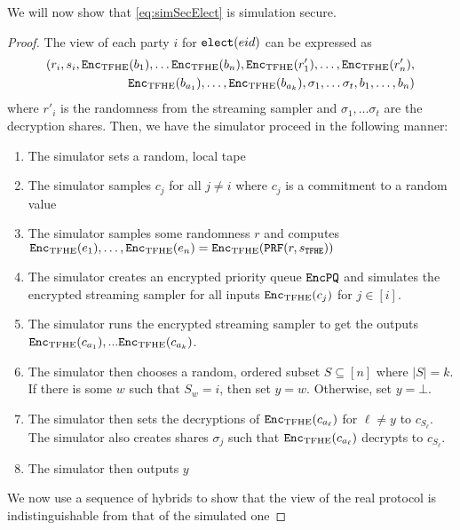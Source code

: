 \begin{lemma}
	We will now show that \cref{eq:simSecElect} is simulation secure.
	\begin{proof}
		The view of each party $i$ for $\texttt{elect}({eid})$ can be expressed as
		\begin{align*}
			(r_i,  s_i, \texttt{Enc}_{\mathrm{TFHE}}(b_{1}), \dots \texttt{Enc}_{\mathrm{TFHE}}(b_n), \texttt{Enc}_{\mathrm{TFHE}}(r'_1), \dots, \texttt{Enc}_{\mathrm{TFHE}}(r'_n), \\
				\texttt{Enc}_{\mathrm{TFHE}}(b_{a_1}), \dots, \texttt{Enc}_{\mathrm{TFHE}}(b_{a_k}), \sigma_1, \dots \sigma_t, b_1, \dots, b_n)
		\end{align*}
		where $r'_i$ is the randomness from the streaming sampler and $\sigma_1, \dots \sigma_t$ are the decryption shares.
		Then, we have the simulator proceed in the following manner:
		\begin{enumerate}
			\item The simulator sets a random, local tape
			\item The simulator samples $c_j$ for all $j \neq i$ where $c_j$ is a commitment to a random value
			\item The simulator samples some randomness $r$ and computes $\texttt{Enc}_{\mathrm{TFHE}}(e_1), \dots, \texttt{Enc}_{\mathrm{TFHE}}(e_n) = \texttt{Enc}_{\mathrm{TFHE}}(\texttt{PRF}(r, s_\texttt{TFHE}))$
			\item The simulator creates an encrypted priority queue $\texttt{EncPQ}$ and simulates the encrypted streaming sampler for all inputs $\texttt{Enc}_{\mathrm{TFHE}}(c_j)$ for $j \in [i]$.
			\item The simulator runs the encrypted streaming sampler to get the outputs $\texttt{Enc}_{\mathrm{TFHE}}(c_{a_1}),... \texttt{Enc}_{\mathrm{TFHE}}(c_{a_k})$.
			\item The simulator then chooses a random, ordered subset $S \subseteq [n]$ where $|S| = k$. 
			If there is some $w$ such that $S_w = i$, then set $y = w$. Otherwise, set $y = \bot$.
			\item The simulator then sets the decryptions of $\texttt{Enc}_{\mathrm{TFHE}}(c_{a_\ell})$ for $\ell \neq y$ to $c_{S_\ell}$.
			The simulator also creates shares $\sigma_j$ such that $\texttt{Enc}_{\mathrm{TFHE}}(c_{a_\ell})$ decrypts to $c_{S_\ell}$.
			\item The simulator then outputs $y$
			
		\end{enumerate}
		We now use a sequence of hybrids to show that the view of the real protocol is indistinguishable from
		that of the simulated one


\end{proof}
\end{lemma}

